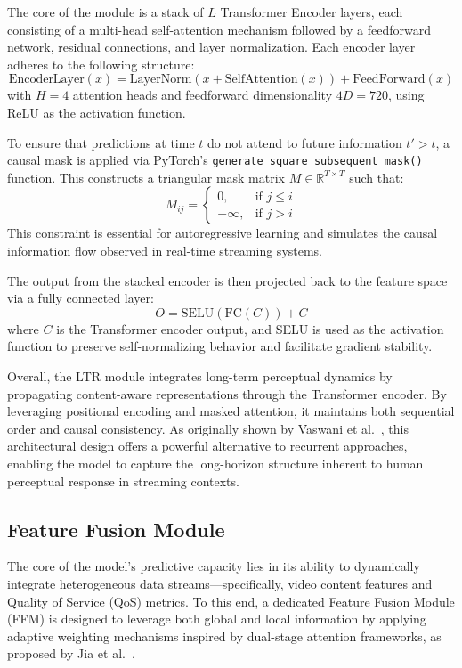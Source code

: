 The core of the module is a stack of $L$ Transformer Encoder layers, each consisting of a multi-head self-attention mechanism followed by a feedforward network, residual connections, and layer normalization. Each encoder layer adheres to the following structure:
\[
\text{EncoderLayer}(x) = \text{LayerNorm}(x + \text{SelfAttention}(x)) + \text{FeedForward}(x)
\]
with $H = 4$ attention heads and feedforward dimensionality $4D = 720$, using ReLU as the activation function.

To ensure that predictions at time $t$ do not attend to future information $t' > t$, a causal mask is applied via PyTorch’s \texttt{generate\_square\_subsequent\_mask()} function. This constructs a triangular mask matrix $M \in \mathbb{R}^{T \times T}$ such that:
\[
M_{ij} =
\begin{cases}
0, & \text{if } j \leq i \\
-\infty, & \text{if } j > i
\end{cases}
\]
This constraint is essential for autoregressive learning and simulates the causal information flow observed in real-time streaming systems.

The output from the stacked encoder is then projected back to the feature space via a fully connected layer:
\[
O = \text{SELU}(\text{FC}(C)) + C
\]
where $C$ is the Transformer encoder output, and SELU is used as the activation function to preserve self-normalizing behavior and facilitate gradient stability.

Overall, the LTR module integrates long-term perceptual dynamics by propagating content-aware representations through the Transformer encoder. By leveraging positional encoding and masked attention, it maintains both sequential order and causal consistency. As originally shown by Vaswani et al.~\cite{vaswani2017attention}, this architectural design offers a powerful alternative to recurrent approaches, enabling the model to capture the long-horizon structure inherent to human perceptual response in streaming contexts.

\subsection{Feature Fusion Module}

The core of the model's predictive capacity lies in its ability to dynamically integrate heterogeneous data streams—specifically, video content features and Quality of Service (QoS) metrics. To this end, a dedicated Feature Fusion Module (FFM) is designed to leverage both global and local information by applying adaptive weighting mechanisms inspired by dual-stage attention frameworks, as proposed by Jia et al.~\cite{jia2024continuous}.


